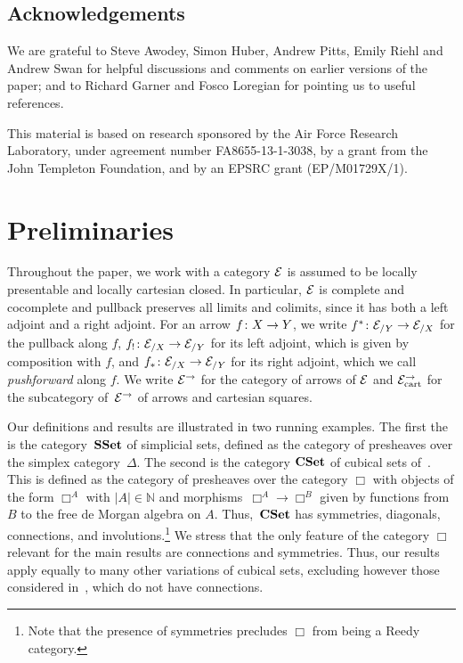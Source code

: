 \documentclass[reqno,10pt,a4paper,oneside,draft]{amsart}
\begin{document}
\subsection*{Acknowledgements}

We are grateful to Steve Awodey, Simon Huber, Andrew Pitts, Emily Riehl and Andrew Swan for helpful discussions and comments on earlier versions of the paper; and to Richard Garner and Fosco Loregian for pointing us to useful references.

This material is based on research sponsored by the Air Force Research Laboratory, under agreement number FA8655-13-1-3038, by a grant from the John Templeton Foundation, and by an EPSRC grant (EP/M01729X/1).


\section{Preliminaries}
\label{sec:fib-and-frob}


Throughout the paper, we work with a category $\cal{E}$ is assumed to be locally presentable and locally cartesian closed. In particular,
$\catE$ is complete and cocomplete and pullback preserves all limits and colimits, since it has both a left 
adjoint and  a right adjoint. For an arrow $f \co X \to Y$, we write $f^* \co \cal{E}_{/Y} \to \cal{E}_{/X}$ for the pullback along $f$, 
$f_{!} \co \cal{E}_{/X} \to \cal{E}_{/Y}$ for its left adjoint, which is given by composition with $f$, and $f_* \co \cal{E}_{/X} \to \cal{E}_{/Y}$
for its right adjoint, which we call \emph{pushforward} along $f$. We write $\cal{E}^\to$ for the category of arrows of $\cal{E}$
and $\cal{E}^\to_{\mathrm{cart}}$ for the subcategory of~$\cal{E}^\to$ of arrows and cartesian squares. 

Our definitions and results are illustrated  in two running examples. The first the is the category~$\SSet$ of simplicial sets, defined as the category of 
presheaves over the simplex category~$\Delta$. The second is the category $\CSet$ of cubical sets of~\cite{cohen-et-al:cubicaltt}. This is defined as the category of presheaves over 
the category $\Box$ with objects of the form $\Box^A$ with $|A| \in \mathbb{N}$ and morphisms~$\Box^A \to \Box^B$ given by functions from $B$ to the free de Morgan algebra on $A$. 
Thus,~$\CSet$ has symmetries, diagonals, connections, and involutions.\footnote{Note that the presence of symmetries precludes $\Box$ from being a Reedy category.} We stress that the only feature of the category $\Box$ relevant for the main results  are connections and symmetries.
Thus, our results apply equally to many other variations of cubical sets, excluding however those considered in~\cite{coquand-cubical-sets,huber-thesis}, which do not have connections.
\end{document}
